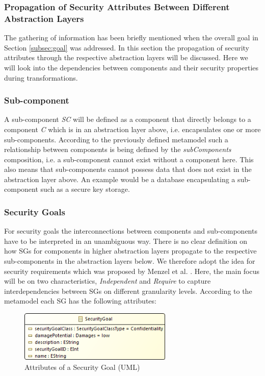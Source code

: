 \subsubsection{Propagation of Security Attributes Between Different Abstraction Layers}
\label{subsubsec:propagation}

The gathering of information has been briefly mentioned when the overall goal in Section \ref{subsec:goal} was addressed. In this section the propagation of security attributes through the respective abstraction layers will be discussed. Here we will look into the dependencies between components and their security properties during transformations.

\subsubsection*{Sub-component}
\label{subsubsec:sub_comp}
A sub-component \textit{SC} will be defined as a component that directly belongs to a component \textit{C} which is in an abstraction layer above, i.e. encapsulates one or more sub-components. According to the previously defined metamodel such a relationship between components is being defined by the \textit{subComponents} composition, i.e. a sub-component cannot exist without a component here. This also means that sub-components cannot possess data that does not exist in the abstraction layer above. An example would be a database encapsulating a sub-component such as a secure key storage.   

\subsubsection*{Security Goals}
\label{subsubsec:sec_goal}
For security goals the interconnections between components and sub-components have to be interpreted in an unambiguous way. There is no clear definition on how SGs for components in higher abstraction layers propagate to the respective sub-components in the abstraction layers below. We therefore adopt the idea for security requirements which was proposed by Menzel et al. \cite{Menzel2008}. Here, the main focus will be on two characteristics, \textit{Independent} and \textit{Require} to capture interdependencies between SGs on different granularity levels. According to the metamodel each SG has the following attributes:

\begin{figure}[H]
\centering
\includegraphics[width=0.65\textwidth]{pictures/securitygoal.png}
\caption{Attributes of a Security Goal (UML)}
\label{fig:security_goal}
\end{figure} 

